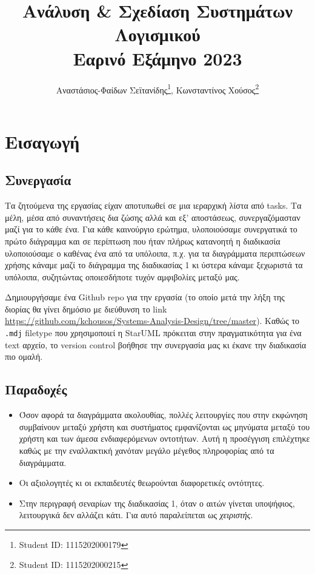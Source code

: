 \documentclass[a4paper, titlepage, twoside]{article}
\author{Αναστάσιος-Φαίδων Σεϊτανίδης\thanks{Student ID: 1115202000179}, Κωνσταντίνος Χούσος\thanks{Student ID: 1115202000215}}
\date{}
\title{Ανάλυση \& Σχεδίαση Συστημάτων Λογισμικού\\\medskip
\large Εαρινό Εξάμηνο 2023}
\begin{document}
\maketitle
\tableofcontents


\newpage

\section{Εισαγωγή}
\label{sec:org2ac16cb}


\subsection{Συνεργασία}
\label{sec:org14bbf67}

Τα ζητούμενα της εργασίας είχαν αποτυπωθεί σε μια ιεραρχική λίστα από tasks. Τα μέλη, μέσα από συναντήσεις δια ζώσης αλλά και εξ' αποστάσεως, συνεργαζόμασταν μαζί για το κάθε ένα. Για κάθε καινούργιο ερώτημα, υλοποιούσαμε συνεργατικά το πρώτο διάγραμμα και σε περίπτωση που ήταν πλήρως κατανοητή η διαδικασία υλοποιούσαμε ο καθένας ένα από τα υπόλοιπα, π.χ. για τα διαγράμματα περιπτώσεων χρήσης κάναμε μαζί το διάγραμμα της διαδικασίας 1 κι ύστερα κάναμε ξεχωριστά τα υπόλοιπα, συζητώντας οποιεσδήποτε τυχόν αμφιβολίες μεταξύ μας.

Δημιουργήσαμε ένα Github repo για την εργασία (το οποίο μετά την λήξη της διορίας θα γίνει δημόσιο με διεύθυνση το link \url{https://github.com/kchousos/Systems-Analysis-Design/tree/master}). Καθώς το \texttt{.mdj} filetype που χρησιμοποιεί η StarUML πρόκειται στην πραγματικότητα για ένα text αρχείο, το version control βοήθησε την συνεργασία μας κι έκανε την διαδικασία πιο ομαλή.

\subsection{Παραδοχές}
\label{sec:org464930f}

\begin{itemize}
\item Όσον αφορά τα διαγράμματα ακολουθίας, πολλές λειτουργίες που στην εκφώνηση συμβαίνουν μεταξύ χρήστη και συστήματος εμφανίζονται ως μηνύματα μεταξύ του χρήστη και των άμεσα ενδιαφερόμενων οντοτήτων. Αυτή η προσέγγιση επιλέχτηκε καθώς με την εναλλακτική χανόταν μεγάλο μέγεθος πληροφορίας από τα διαγράμματα.
\item Οι αξιολογητές κι οι εκπαιδευτές θεωρούνται διαφορετικές οντότητες.
\item Στην περιγραφή σεναρίων της διαδικασίας 1, όταν ο αιτών γίνεται υποψήφιος, λειτουργικά δεν αλλάζει κάτι. Για αυτό παραλείπεται ως \emph{χειριστής}.
\end{itemize}
\end{document}
